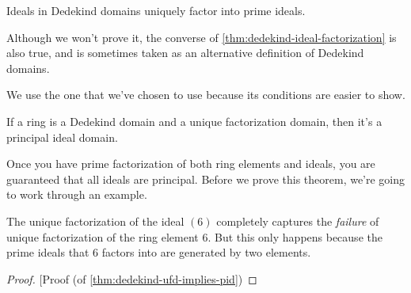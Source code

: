 \begin{theorem}
	\label{thm:dedekind-ideal-factorization}
	Ideals in Dedekind domains uniquely factor into prime ideals.
\end{theorem}

Although we won't prove it, the converse of \autoref{thm:dedekind-ideal-factorization} is also true, and is sometimes taken as an alternative definition of Dedekind domains.

We use the one that we've chosen to use because its conditions are easier to show.


\begin{theorem}
	\label{thm:dedekind-ufd-implies-pid}
	If a ring is a Dedekind domain and a unique factorization domain, then it's a principal ideal domain.
\end{theorem}

Once you have prime factorization of both ring elements and ideals, you are guaranteed that all ideals are principal. Before we prove this theorem, we're going to work through an example.


The unique factorization of the ideal $(6)$ completely captures the \emph{failure} of unique factorization of the ring element $6$. But this only happens because the prime ideals that $6$ factors into are generated by two elements.

\begin{proof}[Proof (of \autoref{thm:dedekind-ufd-implies-pid})
\end{proof}



